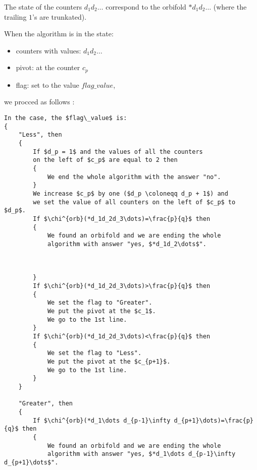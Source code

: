 The state of the counters $d_1d_2\dots$ correspond to the orbifold 
$*d_1d_2\dots$ (where the trailing $1$'s are trunkated). 

When the algorithm is in the state: 
\begin{itemize}
\item counters with values: $d_1d_2\dots$
\item pivot: at the counter $c_p$
\item flag: set to the value $flag\_value$,
\end{itemize}
we procced as follows 
:
\begin{lstlisting}[firstnumber=1,consecutivenumbers=true]
In the case, the $flag\_value$ is: 
{
    "Less", then 
    {
        If $d_p = 1$ and the values of all the counters 
        on the left of $c_p$ are equal to 2 then 
        {
            We end the whole algorithm with the answer "no".
        }
        We increase $c_p$ by one ($d_p \coloneqq d_p + 1$) and
        we set the value of all counters on the left of $c_p$ to $d_p$.
        If $\chi^{orb}(*d_1d_2d_3\dots)=\frac{p}{q}$ then
        {
            We found an orbifold and we are ending the whole
            algorithm with answer "yes, $*d_1d_2\dots$".
            
            
            
        }
        If $\chi^{orb}(*d_1d_2d_3\dots)>\frac{p}{q}$ then  
        {
            We set the flag to "Greater".
            We put the pivot at the $c_1$. 
            We go to the 1st line.
        } 
        If $\chi^{orb}(*d_1d_2d_3\dots)<\frac{p}{q}$ then
        {
            We set the flag to "Less".
            We put the pivot at the $c_{p+1}$.
            We go to the 1st line.
        } 
    }

    "Greater", then
    {
        If $\chi^{orb}(*d_1\dots d_{p-1}\infty d_{p+1}\dots)=\frac{p}{q}$ then
        {
            We found an orbifold and we are ending the whole
            algorithm with answer "yes, $*d_1\dots d_{p-1}\infty d_{p+1}\dots$".
            
            
            

\end{lstlisting}

